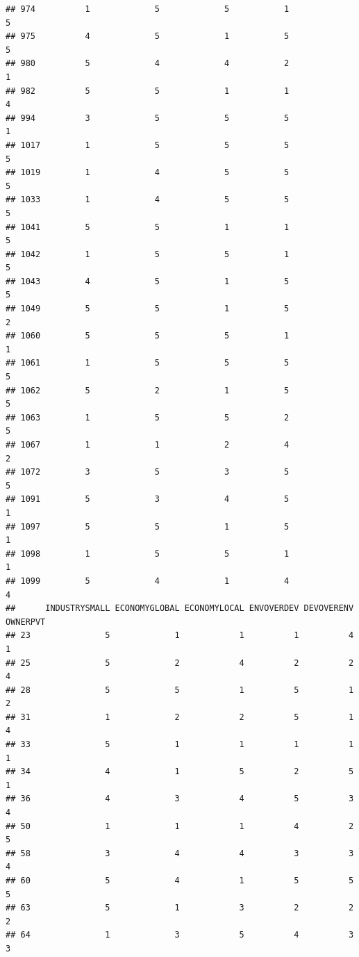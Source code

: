 \documentclass[
]{article}
\begin{document}
\begin{verbatim}
## 974          1             5             5           1             5
## 975          4             5             1           5             5
## 980          5             4             4           2             1
## 982          5             5             1           1             4
## 994          3             5             5           5             1
## 1017         1             5             5           5             5
## 1019         1             4             5           5             5
## 1033         1             4             5           5             5
## 1041         5             5             1           1             5
## 1042         1             5             5           1             5
## 1043         4             5             1           5             5
## 1049         5             5             1           5             2
## 1060         5             5             5           1             1
## 1061         1             5             5           5             5
## 1062         5             2             1           5             5
## 1063         1             5             5           2             5
## 1067         1             1             2           4             2
## 1072         3             5             3           5             5
## 1091         5             3             4           5             1
## 1097         5             5             1           5             1
## 1098         1             5             5           1             1
## 1099         5             4             1           4             4
##      INDUSTRYSMALL ECONOMYGLOBAL ECONOMYLOCAL ENVOVERDEV DEVOVERENV OWNERPVT
## 23               5             1            1          1          4        1
## 25               5             2            4          2          2        4
## 28               5             5            1          5          1        2
## 31               1             2            2          5          1        4
## 33               5             1            1          1          1        1
## 34               4             1            5          2          5        1
## 36               4             3            4          5          3        4
## 50               1             1            1          4          2        5
## 58               3             4            4          3          3        4
## 60               5             4            1          5          5        5
## 63               5             1            3          2          2        2
## 64               1             3            5          4          3        3

\end{verbatim}
\end{document}
